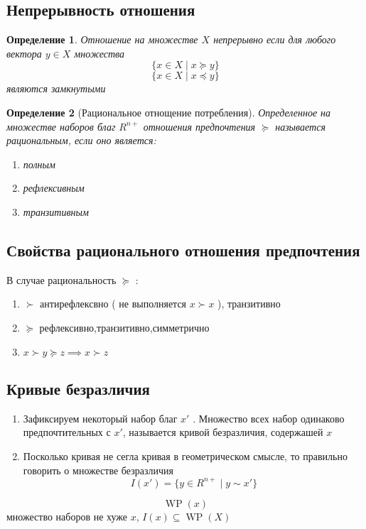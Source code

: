 \documentclass[14pt]{extarticle}
\newtheorem{definition}{Определение}
\DeclareMathOperator{\wpp}{WP}
\begin{document}
	\subsection{Непрерывность отношения}
	\begin{definition}
		Отношение на множестве $X$ 
		непрерывно
		если для любого вектора
		 $y \in X$  
		 множества
		  \begin{equation} 
			  \{x \in X \mid x \succeq y\} 
		 \end{equation} 
		 \begin{equation} 
			 \{x \in X \mid x \preceq y\} 
		 \end{equation} 
		 являются замкнутыми
	\end{definition}
	\begin{definition}[Рациональное отнощение потребления]
		Определенное на множестве
		наборов благ $R^{n+}$ 
		отношения предпочтения $\succeq$ 
		называется
		рациональным, если оно является:
		\begin{enumerate}
			\item полным
			\item рефлексивным
			\item транзитивным
		\end{enumerate}
	\end{definition}
	\subsection{Свойства рационального отношения предпочтения}
	В случае рациональность $\succeq$ :
	\begin{enumerate}
		\item $\succ$ антирефлексвно  ( не выполняется $x \succ x$ ), транзитивно
		\item $\succeq$ рефлексивно,транзитивно,симметрично
		\item $x \succ y \succeq z \implies x \succ z$
	\end{enumerate}
	\subsection{Кривые безразличия}
	\begin{enumerate}
		\item Зафиксируем некоторый набор благ
			$x'$ .
			Множество всех набор одинаково
			предпочтительных с  $x'$,
			называется кривой безразличия, содержашей  $x$
	\item Посколько кривая не сегла кривая в геометрическом
		смысле, то правильно говорить о
		множестве безразличия
		\begin{equation} 
			I(x') = \{y \in R^{n+} \mid y \sim x'\} 
		\end{equation} 
	\end{enumerate}
	\begin{equation} 
	\wpp(x) 
	\end{equation} 
	множество наборов не хуже $x$,  $I(x) \subseteq \wpp(X)$
\end{document}
